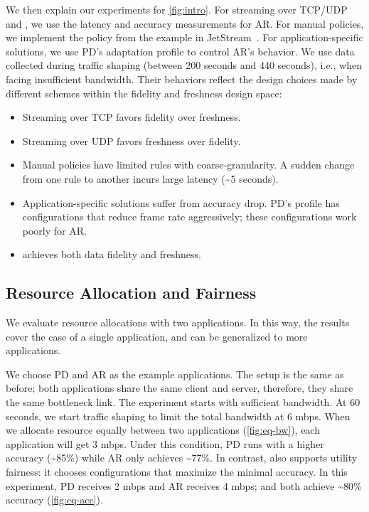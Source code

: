  We then explain our experiments for
\autoref{fig:intro}. For streaming over TCP/UDP and \sysname{}, we use the
latency and accuracy measurements for AR. For manual policies, we implement the
policy from the example in JetStream~\cite{rabkin2014aggregation}. For
application-specific solutions, we use PD's adaptation profile to control AR's
behavior. We use data collected during traffic shaping (between 200 seconds and
440 seconds), i.e., when facing insufficient bandwidth. Their behaviors reflect
the design choices made by different schemes within the fidelity and freshness
design space:

\begin{itemize}[leftmargin=*]
\item Streaming over TCP favors fidelity over freshness.
\item Streaming over UDP favors freshness over fidelity.
\item Manual policies have limited rules with coarse-granularity. A sudden
  change from one rule to another incurs large latency (\textasciitilde 5
  seconds).
\item Application-specific solutions suffer from accuracy drop. PD's profile has
  configurations that reduce frame rate aggressively; these configurations work
  poorly for AR.
\item \sysname{} achieves both data fidelity and freshness.
\end{itemize}

\subsection{Resource Allocation and Fairness}
\label{sec:multi-task-alloc}

We evaluate resource allocations with two applications. In this way, the results
cover the case of a single application, and can be generalized to more
applications.

We choose PD and AR as the example applications. The setup is the same as
before; both applications share the same client and server, therefore, they
share the same bottleneck link. The experiment starts with sufficient
bandwidth. At 60 seconds, we start traffic shaping to limit the total bandwidth
at 6 mbps. When we allocate resource equally between two applications
(\autoref{fig:eq-bw}), each application will get 3 mbps. Under this condition,
PD runs with a higher accuracy (\textasciitilde 85\%) while AR only achieves
\textasciitilde 77\%. In contrast, \sysname{} also supports utility fairness: it
chooses configurations that maximize the minimal accuracy. In this experiment,
PD receives 2 mbps and AR receives 4 mbps; and both achieve \textasciitilde 80\%
accuracy (\autoref{fig:eq-acc}).

